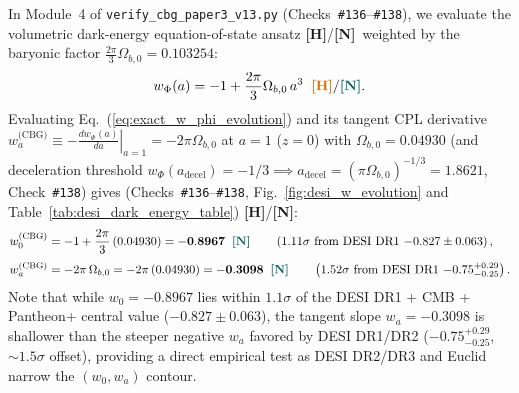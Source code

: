 \documentclass[11pt,a4paper]{article}
\newcommand{\catH}{\textbf{\textcolor{orange!85!black}{[H]}}}
\newcommand{\catN}{\textbf{\textcolor{teal!75!black}{[N]}}}
\theoremstyle{plain}
\theoremstyle{definition}
\theoremstyle{remark}
\numberwithin{equation}{section}
\begin{document}
In Module~4 of \allowbreak\texttt{verify\_cbg\_paper3\_v13.py} (Checks~\texttt{\#136}--\texttt{\#138}), we evaluate the volumetric dark-energy equation-of-state ansatz \catH/\catN\ weighted by the baryonic factor $\frac{2\pi}{3}\Omega_{b,0} = 0.103254$:
\begin{equation}
w_{\Phi}(a) = -1 + \frac{2\pi}{3} \Omega_{b,0}\,a^3 \;\;\catH/\catN.
\label{eq:exact_w_phi_evolution}
\end{equation}
Evaluating Eq.~(\ref{eq:exact_w_phi_evolution}) and its tangent CPL derivative $w_a^{\text{(CBG)}} \equiv -\left.\frac{dw_\Phi(a)}{da}\right\rvert_{a=1} = -2\pi\Omega_{b,0}$ at $a = 1$ ($z = 0$) with $\Omega_{b,0} = 0.04930$ (and deceleration threshold $w_{\Phi}(a_{\text{decel}}) = -1/3 \implies a_{\text{decel}} = (\pi\Omega_{b,0})^{-1/3} = \mathbf{1.8621}$, Check~\texttt{\#138}) gives (Checks~\texttt{\#136}--\texttt{\#138}, Fig.~\ref{fig:desi_w_evolution} and Table~\ref{tab:desi_dark_energy_table}) \catH/\catN:
\begin{align}
w_0^{\text{(CBG)}} &= -1 + \frac{2\pi}{3}\left(0.04930\right) = \mathbf{-0.8967} \;\;\catN \qquad \left(1.11\sigma\text{ from DESI DR1 } {-0.827 \pm 0.063}\right), \nonumber \\[3pt]
w_a^{\text{(CBG)}} &= -2\pi\,\Omega_{b,0} = -2\pi\left(0.04930\right) = \mathbf{-0.3098} \;\;\catN \qquad \left(1.52\sigma\text{ from DESI DR1 } {-0.75^{+0.29}_{-0.25}}\right).
\label{eq:exact_desi_w0_wa_prediction}
\end{align}
Note that while $w_0 = -0.8967$ lies within $1.1\sigma$ of the DESI DR1 + CMB + Pantheon+ central value ($-0.827 \pm 0.063$), the tangent slope $w_a = -0.3098$ is shallower than the steeper negative $w_a$ favored by DESI DR1/DR2 ($-0.75^{+0.29}_{-0.25}$, $\sim 1.5\sigma$ offset), providing a direct empirical test as DESI DR2/DR3 and Euclid narrow the $(w_0, w_a)$ contour.
\end{document}
